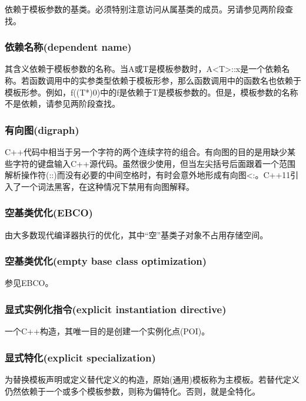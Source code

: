 依赖于模板参数的基类。必须特别注意访问从属基类的成员。另请参见两阶段查找。

\subsubsection{依赖名称(dependent name)}

其含义依赖于模板参数的名称。当A或T是模板参数时，A<T>::x是一个依赖名称。若函数调用中的实参类型依赖于模板形参，那么函数调用中的函数名也依赖于模板形参。例如，f((T*)0)中的f是依赖于T是模板参数的。但是，模板参数的名称不是依赖，请参见两阶段查找。

\subsubsection{有向图(digraph)}

C++代码中相当于另一个字符的两个连续字符的组合。有向图的目的是用缺少某些字符的键盘输入C++源代码。虽然很少使用，但当左尖括号后面跟着一个范围解析操作符(::)而没有必要的中间空格时，有时会意外地形成有向图<:。C++11引入了一个词法黑客，在这种情况下禁用有向图解释。

\subsubsection{空基类优化(EBCO)}

由大多数现代编译器执行的优化，其中“空”基类子对象不占用存储空间。

\subsubsection{空基类优化(empty base class optimization)}

参见EBCO。

\subsubsection{显式实例化指令(explicit instantiation directive)}

一个C++构造，其唯一目的是创建一个实例化点(POI)。

\subsubsection{显式特化(explicit specialization)}

为替换模板声明或定义替代定义的构造，原始(通用)模板称为主模板。若替代定义仍然依赖于一个或多个模板参数，则称为偏特化。否则，就是全特化。

